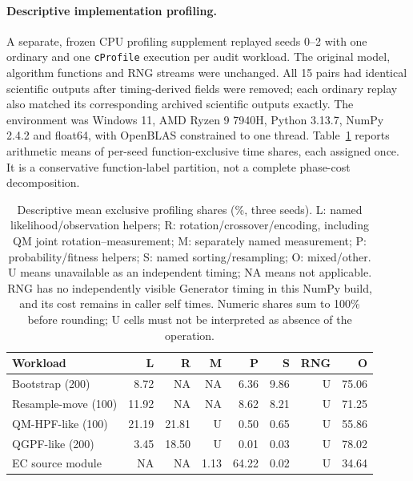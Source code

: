 \paragraph{Descriptive implementation profiling.}
A separate, frozen CPU profiling supplement replayed seeds 0--2 with one
ordinary and one \texttt{cProfile} execution per audit workload. The original
model, algorithm functions and RNG streams were unchanged. All 15 pairs had
identical scientific outputs after timing-derived fields were removed; each
ordinary replay also matched its corresponding archived scientific outputs
exactly. The environment was Windows 11, AMD Ryzen 9 7940H, Python 3.13.7,
NumPy 2.4.2 and float64, with OpenBLAS constrained to one thread.
Table~\ref{tab:profile-exclusive} reports arithmetic means of per-seed
function-exclusive time shares, each assigned once. It is a conservative
function-label partition, not a complete phase-cost decomposition.

\begin{table}[tb]
\centering
\scriptsize
\caption{Descriptive mean exclusive profiling shares (\%, three seeds).
L: named likelihood/observation helpers; R: rotation/crossover/encoding,
including QM joint rotation--measurement; M: separately named measurement;
P: probability/fitness helpers; S: named sorting/resampling; O: mixed/other.
U means unavailable as an independent timing; NA means not applicable.
RNG has no independently visible Generator timing in this NumPy build, and
its cost remains in caller self times. Numeric shares sum to 100\% before
rounding; U cells must not be interpreted as absence of the operation.}
\label{tab:profile-exclusive}
\begin{tabular}{@{}lrrrrrrr@{}}
\toprule
Workload & L & R & M & P & S & RNG & O \\
\midrule
Bootstrap (200) & 8.72 & NA & NA & 6.36 & 9.86 & U & 75.06 \\
Resample-move (100) & 11.92 & NA & NA & 8.62 & 8.21 & U & 71.25 \\
QM-HPF-like (100) & 21.19 & 21.81 & U & 0.50 & 0.65 & U & 55.86 \\
QGPF-like (200) & 3.45 & 18.50 & U & 0.01 & 0.03 & U & 78.02 \\
EC source module & NA & NA & 1.13 & 64.22 & 0.02 & U & 34.64 \\
\bottomrule
\end{tabular}
\end{table}

